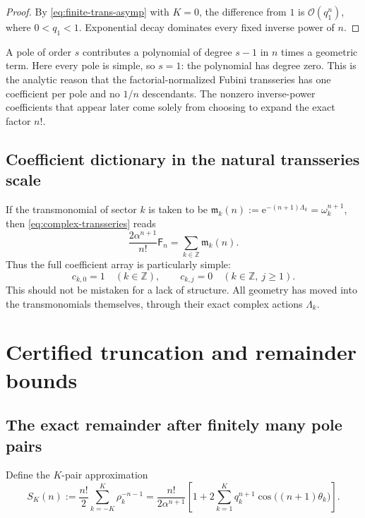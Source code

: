 \documentclass[11pt,a4paper]{article}
\theoremstyle{definition}
\theoremstyle{remark}
\newcommand{\Fub}{\mathsf F}
\newcommand{\e}{\mathrm e}
\newcommand{\cO}{\mathcal O}
\newcommand{\Z}{\mathbb Z}
\begin{document}
\begin{proof}
By \eqref{eq:finite-trans-asymp} with \(K=0\), the difference from \(1\) is
\(\cO(q_1^n)\), where \(0<q_1<1\).  Exponential decay dominates every fixed
inverse power of \(n\).
\end{proof}

\begin{insightbox}
A pole of order \(s\) contributes a polynomial of degree \(s-1\) in \(n\)
times a geometric term.  Here every pole is simple, so \(s=1\): the polynomial
has degree zero.  This is the analytic reason that the factorial-normalized
Fubini transseries has one coefficient per pole and no \(1/n\) descendants.
The nonzero inverse-power coefficients that appear later come solely from
choosing to expand the exact factor \(n!\).
\end{insightbox}

\subsection{Coefficient dictionary in the natural transseries scale}

If the transmonomial of sector \(k\) is taken to be
\(
 \mathfrak m_k(n):=\e^{-(n+1)\Lambda_k}=\omega_k^{n+1}
\), then \eqref{eq:complex-transseries} reads
\begin{equation}\label{eq:natural-coeff}
 \frac{2\alpha^{n+1}}{n!}\Fub_n
 =\sum_{k\in\Z}\mathfrak m_k(n).
\end{equation}
Thus the full coefficient array is particularly simple:
\begin{equation}\label{eq:natural-array}
 c_{k,0}=1\quad(k\in\Z),
 \qquad
 c_{k,j}=0\quad(k\in\Z,\ j\ge1).
\end{equation}
This should not be mistaken for a lack of structure.  All geometry has moved
into the transmonomials themselves, through their exact complex actions
\(\Lambda_k\).

\section{Certified truncation and remainder bounds}

\subsection{The exact remainder after finitely many pole pairs}

Define the \(K\)-pair approximation
\begin{equation}\label{eq:SK}
 S_K(n):=\frac{n!}{2}\sum_{k=-K}^{K}\rho_k^{-n-1}
 =\frac{n!}{2\alpha^{n+1}}
 \left[1+2\sum_{k=1}^{K}q_k^{n+1}
 \cos\bigl((n+1)\theta_k\bigr)\right].
\end{equation}
\end{document}
